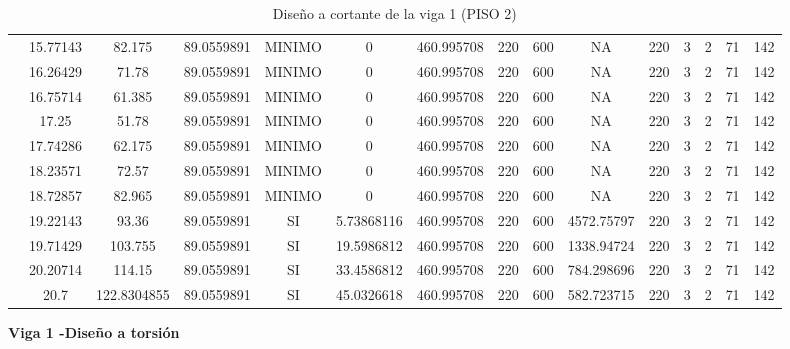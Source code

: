 \begin{table}[H]
{\begin{tabular}{|c|c|c|c|c|c|c|c|c|c|c|c|c|c|c|}
\cline{2-15}    & 15.77143 & 82.175 & 89.0559891 & MINIMO & 0   & 460.995708 & 220 & 600 & NA  & 220 & 3   & 2   & 71  & 142 \bigstrut\\
\cline{2-15}    & 16.26429 & 71.78 & 89.0559891 & MINIMO & 0   & 460.995708 & 220 & 600 & NA  & 220 & 3   & 2   & 71  & 142 \bigstrut\\
\cline{2-15}    & 16.75714 & 61.385 & 89.0559891 & MINIMO & 0   & 460.995708 & 220 & 600 & NA  & 220 & 3   & 2   & 71  & 142 \bigstrut\\
\cline{2-15}    & 17.25 & 51.78 & 89.0559891 & MINIMO & 0   & 460.995708 & 220 & 600 & NA  & 220 & 3   & 2   & 71  & 142 \bigstrut\\
\cline{2-15}    & 17.74286 & 62.175 & 89.0559891 & MINIMO & 0   & 460.995708 & 220 & 600 & NA  & 220 & 3   & 2   & 71  & 142 \bigstrut\\
\cline{2-15}    & 18.23571 & 72.57 & 89.0559891 & MINIMO & 0   & 460.995708 & 220 & 600 & NA  & 220 & 3   & 2   & 71  & 142 \bigstrut\\
\cline{2-15}    & 18.72857 & 82.965 & 89.0559891 & MINIMO & 0   & 460.995708 & 220 & 600 & NA  & 220 & 3   & 2   & 71  & 142 \bigstrut\\
\cline{2-15}    & 19.22143 & 93.36 & 89.0559891 & SI  & 5.73868116 & 460.995708 & 220 & 600 & 4572.75797 & 220 & 3   & 2   & 71  & 142 \bigstrut\\
\cline{2-15}    & 19.71429 & 103.755 & 89.0559891 & SI  & 19.5986812 & 460.995708 & 220 & 600 & 1338.94724 & 220 & 3   & 2   & 71  & 142 \bigstrut\\
\cline{2-15}    & 20.20714 & 114.15 & 89.0559891 & SI  & 33.4586812 & 460.995708 & 220 & 600 & 784.298696 & 220 & 3   & 2   & 71  & 142 \bigstrut\\
\cline{2-15}    & 20.7 & 122.8304855 & 89.0559891 & SI  & 45.0326618 & 460.995708 & 220 & 600 & 582.723715 & 220 & 3   & 2   & 71  & 142 \bigstrut\\
\hline
\end{tabular}%

  

  }%
    \caption{Diseño a cortante de la viga 1 (PISO 2) }
  \label{tab:C VG1 P2 }%
\end{table}%
\newpage
\textbf{Viga 1 -Diseño a torsión}
